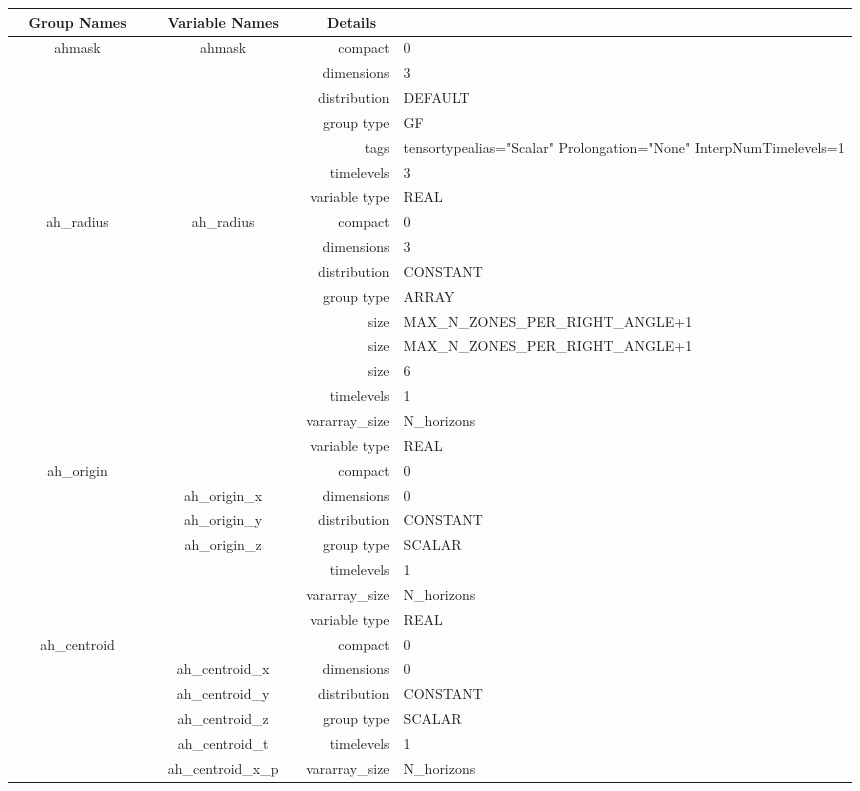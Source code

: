 \vspace{5mm}

\begin{tabular*}{150mm}{|c|c@{\extracolsep{\fill}}|rl|} \hline 
~ {\bf Group Names} ~ & ~ {\bf Variable Names} ~  &{\bf Details} ~ & ~\\ 
\hline 
ahmask & ahmask & compact & 0 \\ 
 &  & dimensions & 3 \\ 
 &  & distribution & DEFAULT \\ 
 &  & group type & GF \\ 
 &  & tags & tensortypealias="Scalar" Prolongation="None" InterpNumTimelevels=1 \\ 
 &  & timelevels & 3 \\ 
 &  & variable type & REAL \\ 
\hline 
ah\_radius & ah\_radius & compact & 0 \\ 
 &  & dimensions & 3 \\ 
 &  & distribution & CONSTANT \\ 
 &  & group type & ARRAY \\ 
 &  & size & MAX\_N\_ZONES\_PER\_RIGHT\_ANGLE+1 \\ 
& ~ & size & MAX\_N\_ZONES\_PER\_RIGHT\_ANGLE+1 \\ 
 &  & size & 6 \\ 
 &  & timelevels & 1 \\ 
 &  & vararray\_size & N\_horizons \\ 
 &  & variable type & REAL \\ 
\hline 
ah\_origin &  & compact & 0 \\ 
 & ah\_origin\_x & dimensions & 0 \\ 
 & ah\_origin\_y & distribution & CONSTANT \\ 
 & ah\_origin\_z & group type & SCALAR \\ 
 &  & timelevels & 1 \\ 
 &  & vararray\_size & N\_horizons \\ 
 &  & variable type & REAL \\ 
\hline 
ah\_centroid &  & compact & 0 \\ 
 & ah\_centroid\_x & dimensions & 0 \\ 
 & ah\_centroid\_y & distribution & CONSTANT \\ 
 & ah\_centroid\_z & group type & SCALAR \\ 
 & ah\_centroid\_t & timelevels & 1 \\ 
 & ah\_centroid\_x\_p & vararray\_size & N\_horizons \\ 

\end{tabular*}
